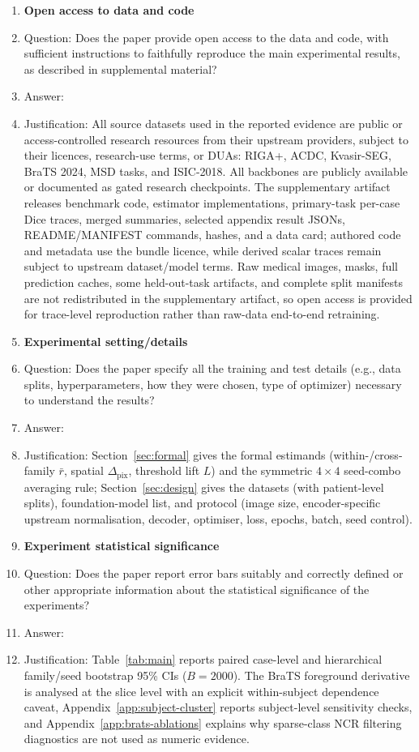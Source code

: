 \begin{enumerate}[leftmargin=*,itemsep=2pt,parsep=0pt,topsep=2pt]
\item {\bf Open access to data and code}
    \item[] Question: Does the paper provide open access to the data and code, with sufficient instructions to faithfully reproduce the main experimental results, as described in supplemental material?
    \item[] Answer: \answerYes{}
\item[] Justification: All source datasets used in the reported evidence are public or access-controlled research resources from their upstream providers, subject to their licences, research-use terms, or DUAs: RIGA+, ACDC, Kvasir-SEG, BraTS 2024, MSD tasks, and ISIC-2018. All backbones are publicly available or documented as gated research checkpoints. The supplementary artifact releases benchmark code, estimator implementations, primary-task per-case Dice traces, merged summaries, selected appendix result JSONs, README/MANIFEST commands, hashes, and a data card; authored code and metadata use the bundle licence, while derived scalar traces remain subject to upstream dataset/model terms. Raw medical images, masks, full prediction caches, some held-out-task artifacts, and complete split manifests are not redistributed in the supplementary artifact, so open access is provided for trace-level reproduction rather than raw-data end-to-end retraining.

\item {\bf Experimental setting/details}
    \item[] Question: Does the paper specify all the training and test details (e.g., data splits, hyperparameters, how they were chosen, type of optimizer) necessary to understand the results?
    \item[] Answer: \answerYes{}
    \item[] Justification: Section~\ref{sec:formal} gives the formal estimands (within-/cross-family $\bar{r}$, spatial $\Delta_{\mathrm{pix}}$, threshold lift $L$) and the symmetric $4{\times}4$ seed-combo averaging rule; Section~\ref{sec:design} gives the datasets (with patient-level splits), foundation-model list, and protocol (image size, encoder-specific upstream normalisation, decoder, optimiser, loss, epochs, batch, seed control).

\item {\bf Experiment statistical significance}
    \item[] Question: Does the paper report error bars suitably and correctly defined or other appropriate information about the statistical significance of the experiments?
    \item[] Answer: \answerYes{}
    \item[] Justification: Table~\ref{tab:main} reports paired case-level and hierarchical family/seed bootstrap 95\% CIs ($B{=}2000$). The BraTS foreground derivative is analysed at the slice level with an explicit within-subject dependence caveat, Appendix~\ref{app:subject-cluster} reports subject-level sensitivity checks, and Appendix~\ref{app:brats-ablations} explains why sparse-class NCR filtering diagnostics are not used as numeric evidence.


\end{enumerate}
